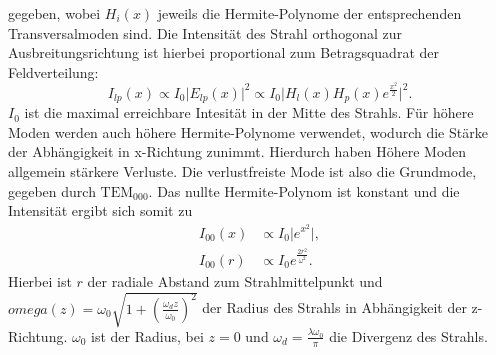 gegeben, wobei $H_i(x)$ jeweils die Hermite-Polynome der entsprechenden Transversalmoden sind. Die Intensität des Strahl orthogonal zur Ausbreitungsrichtung ist hierbei
proportional zum Betragsquadrat der Feldverteilung:
\begin{equation}
    I_{lp}(x) \propto I_0 \lvert E_{lp}(x) \rvert ^2 \propto I_0 \lvert H_l(x) H_p(x) e^{\frac{x^2}{2}} \rvert ^2.
\end{equation}
$I_0$ ist die maximal erreichbare Intesität in der Mitte des Strahls. Für höhere Moden werden auch höhere Hermite-Polynome verwendet, wodurch die Stärke der
Abhängigkeit in x-Richtung zunimmt. Hierdurch haben Höhere Moden allgemein stärkere Verluste. Die verlustfreiste Mode ist also die Grundmode, gegeben durch $\mathrm{TEM}_{000}$.
Das nullte Hermite-Polynom ist konstant und die Intensität ergibt sich somit zu
\begin{align}
    I_{00}(x) &\propto I_0 \lvert e^{x^2} \rvert ,\\
    I_{00}(r) &\propto I_0 e^{\frac{2r^2}{\omega^2}}.
\end{align}
Hierbei ist $r$ der radiale Abstand zum Strahlmittelpunkt und $omega(z) = \omega_0\sqrt{1+(\frac{\omega_d z}{\omega_0})^2}$ der Radius des Strahls in Abhängigkeit der z-Richtung.
$\omega_0$ ist der Radius, bei $z=0$ und $\omega_d = \frac{\lambda\omega_0}{\pi}$ die Divergenz des Strahls.